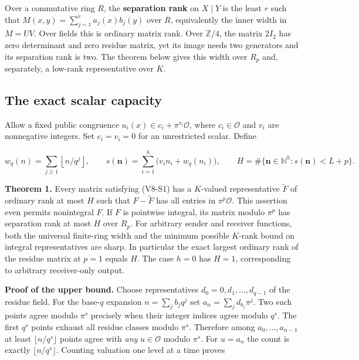 \documentclass[
  11pt,
]{article}
\begin{document}
Over a commutative ring \(R\), the \textbf{separation rank} on
\(X\mid Y\) is the least \(r\) such that
\(M(x,y)=\sum_{j=1}^r a_j(x)b_j(y)\) over \(R\), equivalently the inner
width in \(M=UV\). Over fields this is ordinary matrix rank. Over
\(\mathbb Z/4\), the matrix \(2I_2\) has zero determinant and zero
residue matrix, yet its image needs two generators and its separation
rank is two. The theorem below gives this width over \(R_p\) and,
separately, a low-rank representative over \(K\).

\subsection{The exact scalar capacity}\label{v8-the-exact-scalar-capacity}

Allow a fixed public congruence \(u_i(x)\in c_i+\pi^{v_i}\mathcal O\),
where \(c_i\in\mathcal O\) and \(v_i\) are nonnegative integers. Set
\(c_i=v_i=0\) for an unrestricted scalar. Define

\[
 w_q(n)=\sum_{j\ge1}\left\lfloor n/q^j\right\rfloor,\qquad
 s(\boldsymbol n)=\sum_{i=1}^h\big(v_i n_i+w_q(n_i)\big),\qquad
 H=\#\{\boldsymbol n\in\mathbb N^h:s(\boldsymbol n)<L+p\}.          \tag{V8-S2}
\]

\textbf{Theorem 1.} Every matrix satisfying (V8-S1) has a \(K\)-valued
representative \(\widetilde F\) of ordinary rank at most \(H\) such that
\(F-\widetilde F\) has all entries in \(\pi^p\mathcal O\). This
assertion even permits nonintegral \(F\). If \(F\) is pointwise
integral, its matrix modulo \(\pi^p\) has separation rank at most \(H\)
over \(R_p\). For arbitrary sender and receiver functions, both the
universal finite-ring width and the minimum possible \(K\)-rank bound on
integral representatives are sharp. In particular the exact largest
ordinary rank of the residue matrix at \(p=1\) equals \(H\). The case
\(h=0\) has \(H=1\), corresponding to arbitrary receiver-only output.

\textbf{Proof of the upper bound.} Choose representatives
\(d_0=0,d_1,\ldots,d_{q-1}\) of the residue field. For the base-\(q\)
expansion \(n=\sum_j b_j q^j\) set \(a_n=\sum_j d_{b_j}\pi^j\). Two such
points agree modulo \(\pi^s\) precisely when their integer indices agree
modulo \(q^s\). The first \(q^s\) points exhaust all residue classes
modulo \(\pi^s\). Therefore among \(a_0,\ldots,a_{n-1}\) at least
\(\lfloor n/q^s\rfloor\) points agree with \emph{any} \(u\in\mathcal O\)
modulo \(\pi^s\). For \(u=a_n\) the count is exactly
\(\lfloor n/q^s\rfloor\). Counting valuation one level at a time proves
\end{document}
